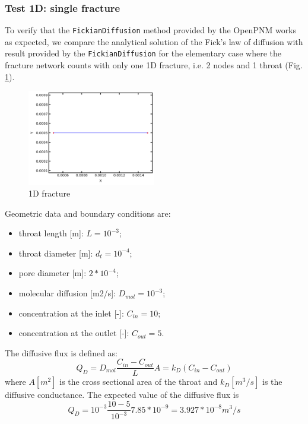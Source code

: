 \documentclass{article}
\begin{document}
\subsubsection{Test 1D: single fracture}
To  verify that the \texttt{FickianDiffusion} method provided by the OpenPNM works as expected, we compare the analytical solution of the Fick's law of diffusion with result provided by the \texttt{FickianDiffusion} for the elementary case where the fracture network counts with only one 1D fracture, i.e. 2 nodes and 1 throat (Fig. \ref{fig:OneFracture}).
\begin{figure}[htbp]
    \centering
    \includegraphics[width=0.5\textwidth]{images/fromOpenPNM/oneFracture.png}
    \caption{1D fracture}
    \label{fig:OneFracture}
\end{figure}
Geometric data and boundary conditions are:
\begin{itemize}
    \item throat length [m]: $L = 10^{-3}$;
    \item throat diameter [m]: $d_t = 10^{-4}$;
    \item pore diameter [m]: $2*10^{-4}$;
    \item molecular diffusion [m2/s]: $D_{mol} = 10^{-3}$;
    \item concentration at the inlet [-]: $C_{in} = 10$;
    \item concentration at the outlet [-]: $C_{out} = 5$.
\end{itemize}
The diffusive flux is defined as:
\begin{equation}
    Q_D = D_{mol} \frac{C_{in}-C_{out}}{L} A = k_D (C_{in}-C_{out})
    \label{eq:DiffCond}
\end{equation}
where $A [m^2]$ is the cross sectional area of the throat and $k_D [m^3/s]$ is the diffusive conductance.
The expected value of the diffusive flux is
\begin{equation}
    Q_D = 10^{-3} \frac{10-5}{10^{-3}} 7.85*10^{-9} = 3.927*10^{-8} m^3/s
\end{equation}
\end{document}
